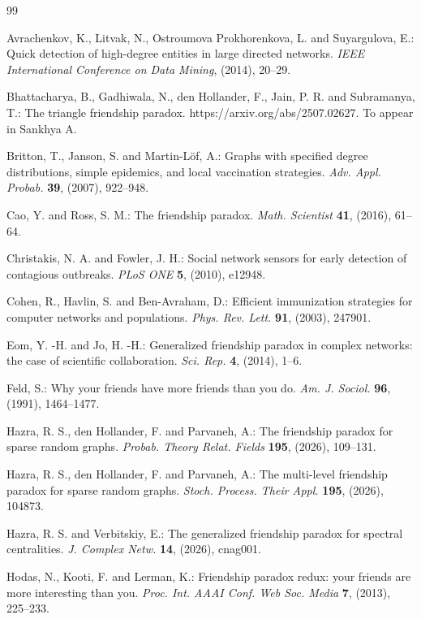 \documentclass[11pt]{article}
\numberwithin{equation}{section}
\theoremstyle{plain}
\begin{document}
\begin{thebibliography}{99}

Avrachenkov, K., Litvak, N., Ostroumova Prokhorenkova, L. and Suyargulova, E.: Quick detection of high-degree entities in large directed networks. \emph{IEEE International Conference on Data Mining}, (2014), 20--29.

Bhattacharya, B., Gadhiwala, N., den Hollander, F., Jain, P. R. and Subramanya, T.: The triangle friendship paradox.
https://arxiv.org/abs/2507.02627. To appear in Sankhya A.

 Britton, T., Janson, S. and Martin-L\"{o}f, A.: Graphs with specified degree distributions, simple epidemics, and local vaccination strategies. \emph{Adv. Appl. Probab.} \textbf{39}, (2007), 922--948.

Cao, Y. and Ross, S. M.: The friendship paradox. \emph{Math. Scientist} \textbf{41}, (2016), 61--64.

Christakis, N. A. and Fowler, J. H.: Social network sensors for early detection of contagious outbreaks. \emph{PLoS ONE} \textbf{5}, (2010), e12948.

Cohen, R., Havlin, S. and Ben-Avraham, D.: Efficient immunization strategies for computer networks and populations. \emph{Phys. Rev. Lett.} \textbf{91}, (2003), 247901.

Eom, Y. -H. and Jo, H. -H.: Generalized friendship paradox in complex networks: the case of scientific collaboration. \emph{Sci. Rep.} \textbf{4}, (2014), 1--6.

Feld, S.: Why your friends have more friends than you do. \emph{Am. J. Sociol.} \textbf{96}, (1991), 1464--1477.

Hazra, R. S., den Hollander, F. and Parvaneh, A.: The friendship paradox for sparse random graphs. \emph{Probab. Theory Relat. Fields} \textbf{195}, (2026), 109--131.

Hazra, R. S., den Hollander, F. and Parvaneh, A.: The multi-level friendship paradox for sparse random graphs. \emph{Stoch. Process. Their Appl.} \textbf{195}, (2026), 104873.

Hazra, R. S. and Verbitskiy, E.: The generalized friendship paradox for spectral centralities. 
\emph{J. Complex Netw.} \textbf{14}, (2026), cnag001.

Hodas, N., Kooti, F. and Lerman, K.: Friendship paradox redux: your friends are more interesting than you. \emph{Proc. Int. AAAI Conf. Web Soc. Media} \textbf{7}, (2013), 225--233.


\end{thebibliography}
\end{document}
